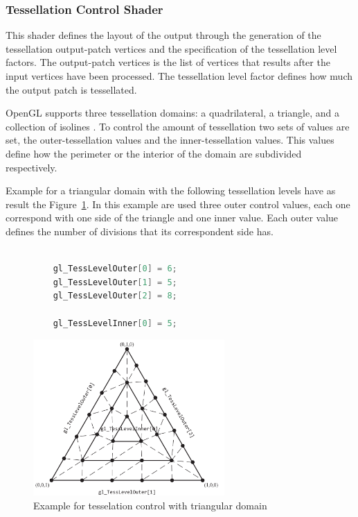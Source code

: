 \subsubsection{Tessellation Control Shader} %
\label{ssub:tesselation_control_shader}
	This shader defines the layout of the output through the generation of the tessellation output-patch vertices and the specification of the tessellation level factors. The output-patch vertices is the list of vertices that results after the input vertices have been processed. The tessellation level factor defines how much the output patch is tessellated. 

	OpenGL supports three tessellation domains: a quadrilateral, a triangle, and a collection of isolines \cite{shreiner2013opengl}. To control the amount of tessellation two sets of values are set, the outer-tessellation values and the inner-tessellation values. This values define how the perimeter or the interior of the domain are subdivided respectively. 

	Example for a triangular domain with the following tessellation levels have as result the Figure~\ref{fig:ex1TessControl}. In this example are used three outer control values, each one correspond with one side of the triangle and one inner value. Each outer value defines the number of divisions that its correspondent side has. 
\begin{figure}[htbp]
	\centering
	\begin{lstlisting}[frame=single,language=C++]

	gl_TessLevelOuter[0] = 6;
	gl_TessLevelOuter[1] = 5;
	gl_TessLevelOuter[2] = 8;

	gl_TessLevelInner[0] = 5;
	\end{lstlisting}
	\includegraphics[width=0.65\textwidth]{img/OpenGL/TessShaderEx1.png}
	\caption{Example for tesselation control with triangular domain \cite{shreiner2013opengl}}
	\label{fig:ex1TessControl}
\end{figure}

